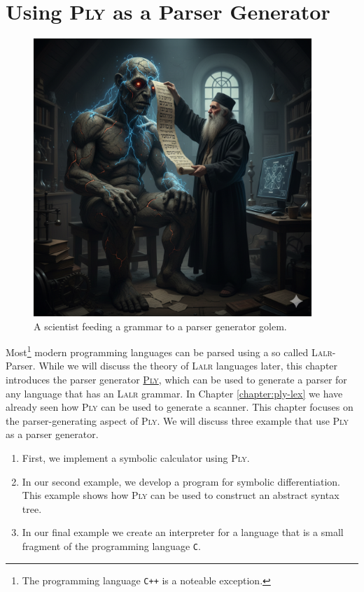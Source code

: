 \chapter{Using \textsc{Ply} as a Parser Generator  \label{chapter:ply}}

\begin{figure}[h] 
\centering
  \includegraphics[width=10.5cm]{Abbildungen/golem.png}
\caption{A scientist feeding a grammar to a parser generator golem.}
\label{fig:golem.png}
\end{figure}


Most\footnote{The programming language \texttt{C++} is a noteable exception.} modern programming languages can
be parsed using a so called \textsc{Lalr}-Parser.  While we will discuss the theory of \textsc{Lalr} languages
later, this chapter introduces the parser generator \href{https://www.dabeaz.com/ply/}{\textsc{Ply}}, which can be used to
generate a parser for any language that has an \textsc{Lalr} grammar.  In Chapter \ref{chapter:ply-lex} we have already
seen how \textsc{Ply} can be used to generate a scanner.  This chapter focuses on the parser-generating aspect
of \textsc{Ply}.
We will discuss three example that use \textsc{Ply} as a parser generator.
\begin{enumerate}
\item First, we implement a symbolic calculator using \textsc{Ply}.
\item In our second example, we develop a program for symbolic differentiation.
      This example shows how \textsc{Ply} can be used to construct an abstract syntax tree.
\item In our final example we create an interpreter for a language that is a small fragment of the
      programming language \texttt{C}.
\end{enumerate}



